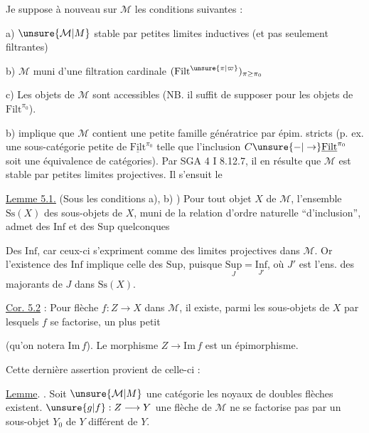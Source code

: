 Je suppose à nouveau  sur $\mathcal M$ les
conditions suivantes :


a) $\unsure{\mathcal M|M}$ stable par petites limites inductives (et pas
seulement filtrantes)

b) $\mathcal M$  muni d'une
filtration cardinale $(\mathrm{Filt}^{\unsure{\pi|\varpi}})_{\pi\geq\pi_0}$

c) Les objets de $\mathcal M$ sont accessibles (NB. il suffit
de  supposer pour les objets de $\mathrm{Filt}^{\pi_0}$).

b) implique que $\mathcal M$ contient une petite
famille génératrice par épim. stricts (p. ex.
une sous-catégorie  petite de $\underline{\mathrm{Filt}}^{\pi_0}$  telle
que l'inclusion $C\unsure{-|\to}\underline{\mathrm{Filt}}^{\pi_0}$ soit une
équivalence de catégories). Par SGA 4 I 8.12.7,
il en résulte que $\mathcal M$ est stable par petites
limites projectives. Il s'ensuit le

\uline{Lemme 5.1.} (Sous les conditions a), b) ) Pour
tout objet $X$ de $\mathcal M$, l'ensemble $\mathrm{Ss}(X)$
des sous-objets de $X$, muni de la relation
d'ordre naturelle ``d'inclusion'', \deleted{\unsure{\}|;}} admet des
$\mathrm{Inf}$ et des $\mathrm{Sup}$ quelconques

Des $\mathrm{Inf}$, car ceux-ci s'expriment comme
des limites projectives dans $\mathcal M$. Or l'existence
des $\mathrm{Inf}$ implique celle des $\mathrm{Sup}$,
puisque $\underset{J}{\mathrm{Sup}}=\underset{J'}{\mathrm{Inf}}$, où $J'$ est l'ens.
des majorants de $J$ dans $\mathrm{Ss}(X)$.

\uline{Cor. 5.2} : Pour  flèche $f:Z\longrightarrow X$
dans $\mathcal M$, il existe, parmi les sous-objets  de $X$
par lesquels $f$ se factorise, un plus petit


(qu'on notera $\mathrm{Im}\,f$). Le morphisme
$Z\longrightarrow\mathrm{Im}\,f$ est un épimorphisme.

Cette dernière assertion  provient de
celle-ci :

\uline{Lemme}. . Soit  $\unsure{\mathcal M|M}$ une catégorie
 les noyaux de doubles flèches existent.
 $\unsure{g|f}:Z\longrightarrow Y$ une flèche de $\mathcal M$  \inserted{Alors $g$ est épi \unsure{ssi} $\unsure{\exists|]}$, $g$}
ne se factorise pas par un sous-objet  $Y_0$ de $Y$ différent de $Y$.

